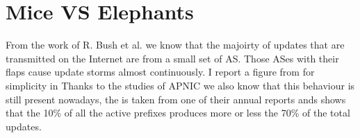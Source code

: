 
\section{Mice VS Elephants}
\label{sec:bgp_rfd_mice_vs_elephants}

From the work of R. Bush et al. \cite{pelsser2011route} we know that the majoirty
of updates that are transmitted on the Internet are from a small set of \ac{AS}.
Those \ac{AS}es with their flaps cause update storms almost continuously.
I report a figure from \cite{pelsser2011route} for simplicity in 
Thanks to the studies of APNIC 
we also know that this behaviour is still present nowadays, the 
is taken from one of their annual reports ands shows that the \num{10}\% of
all the active prefixes produces more or less the \num{70}\% of the total
updates.

